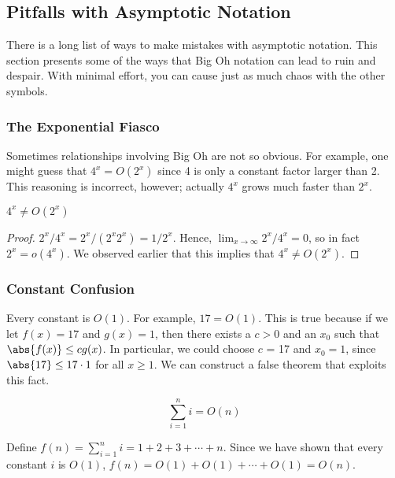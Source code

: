 \subsection{Pitfalls with Asymptotic Notation}

There is a long list of ways to make mistakes with asymptotic
notation.  This section presents some of the ways that Big Oh notation
can lead to ruin and despair.  With minimal effort, you can cause just
as much chaos with the other symbols.

\subsubsection{The Exponential Fiasco}

Sometimes relationships involving Big Oh are not so obvious.  For
example, one might guess that $4^x = O(2^x)$ since 4 is only a
constant factor larger than 2.  This reasoning is incorrect,
however; actually $4^x$ grows much faster than $2^x$.

\begin{proposition}
$4^x \neq O(2^x)$
\end{proposition}

\begin{proof}
$2^x/4^x = 2^x/(2^x2^x) = 1/2^x$.  Hence, $\lim_{x \rightarrow \infty}
2^x/4^x = 0$, so in fact $2^x = o(4^x)$.  We observed earlier that this
implies that $4^x \neq O(2^x)$.
\end{proof}

\subsubsection{Constant Confusion}

Every constant is $O(1)$.  For example, $17 = O(1)$.  This is true because
if we let $f(x) = 17$ and $g(x) = 1$, then there exists a $c > 0$ and an
$x_0$ such that $\abs{f(x)} \leq c g(x)$.  In particular, we could choose
$c$ = 17 and $x_0 = 1$, since $\abs{17} \leq 17 \cdot 1$ for all $x \geq
1$.  We can construct a false theorem that exploits this fact.

\begin{falsethm}
\[
\sum_{i=1}^n i = O(n)
\]
\end{falsethm}

\begin{falseproof}
Define $f(n) = \sum_{i=1}^n i = 1 + 2 + 3 + \cdots + n$.  Since we
have shown that every constant $i$ is $O(1)$, $f(n) = O(1) + O(1) +
\cdots + O(1) = O(n)$.
\end{falseproof}

